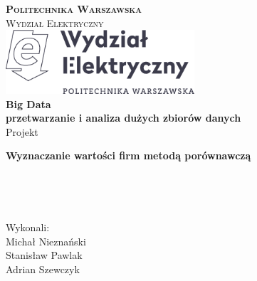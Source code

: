 

\begin{titlepage}

	
	\thispagestyle{fancy}							%
	\fancyhf{}										%
	\renewcommand{\headrulewidth}{0pt}				%
	
	\linespread{1.0}								%

	\center
	
	
	\textsc{\LARGE \textbf{Politechnika Warszawska}}\\[0.75cm]
	\textsc{\Large Wydział Elektryczny}\\[2cm]


	\includegraphics[width=7cm]{figures/WE-znak}\\[2cm]
	
	
	{\LARGE \textbf{Big Data \\ przetwarzanie i analiza dużych zbiorów danych}\\[0.3cm]}
	{\Large Projekt\\[2.5cm]}
		
	
	{\huge \bfseries Wyznaczanie wartości firm metodą porównawczą}\\[4.5cm]

	
	\large
	\begin{minipage}{0.2\textwidth}
	~
	\end{minipage}
	~
	\begin{minipage}{0.7\textwidth}
		\begin{flushright}
		Wykonali:\\
 		Michał Nieznański\\
 		Stanisław Pawlak\\
 		Adrian Szewczyk\\
 		
		\end{flushright}
	\end{minipage}	
	
\end{titlepage}

